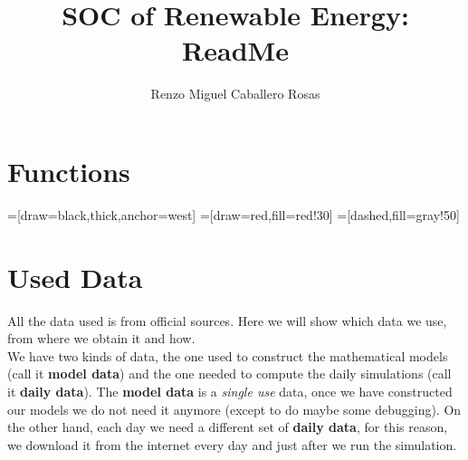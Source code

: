 \documentclass[12pt]{article}
\theoremstyle{definition}
\theoremstyle{remark}
\begin{document}
\sloppy
\title{SOC of Renewable Energy: ReadMe}
\author{Renzo Miguel Caballero Rosas} 
\maketitle

\tableofcontents

\section{Functions}

=[draw=black,thick,anchor=west]
=[draw=red,fill=red!30]
=[dashed,fill=gray!50]

\section{Used Data}

All the data used is from official sources. Here we will show which data we use, from where we obtain it and how.\\
We have two kinds of data, the one used to construct the mathematical models (call it \textbf{model data}) and the one needed to compute the daily simulations (call it \textbf{daily data}). The \textbf{model data} is a \textit{single use} data, once we have constructed our models we do not need it anymore (except to do maybe some debugging). On the other hand, each day we need a different set of \textbf{daily data}, for this reason, we download it from the internet every day and just after we run the simulation.
\end{document}
